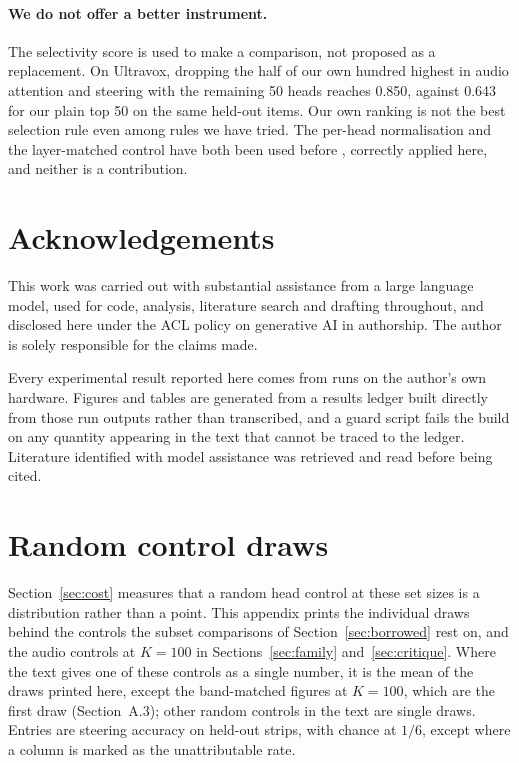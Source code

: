 \documentclass[11pt]{article}
\begin{document}
\paragraph{We do not offer a better instrument.} The selectivity score is used to
make a comparison, not proposed as a replacement. On Ultravox, dropping the
half of our own hundred highest in audio attention and steering with the remaining 50 heads
reaches 0.850, against 0.643 for our plain top 50 on the same held-out items. Our
own ranking is not the best selection rule even among rules we have tried. The
per-head normalisation and the layer-matched control have both been used before
\citep{kang2025sink, shengfu2026matched}, correctly applied here, and
neither is a contribution.

\section*{Acknowledgements}

This work was carried out with substantial assistance from a large language
model, used for code, analysis, literature search and drafting throughout, and
disclosed here under the ACL policy on generative AI in authorship. The author
is solely responsible for the claims made.

Every experimental result reported here comes from runs on the author's own
hardware. Figures and tables are generated from a results ledger built directly
from those run outputs rather than transcribed, and a guard script fails the
build on any quantity appearing in the text that cannot be traced to the ledger.
Literature identified with model assistance was retrieved and read before being
cited.

\begingroup\makeatletter
\def\@listi{\leftmargin\leftmargini \parsep 1pt \topsep 2pt \itemsep 1pt}\let\@listI\@listi
\makeatother

\endgroup

\clearpage
\onecolumn
\raggedbottom
\appendix
\section{Random control draws}
\label{app:sets}

Section~\ref{sec:cost} measures that a random head control at these set sizes is a
distribution rather than a point. This appendix prints the individual draws behind
the controls the subset comparisons of Section~\ref{sec:borrowed} rest on, and the
audio controls at $K{=}100$ in Sections~\ref{sec:family} and~\ref{sec:critique}.
Where the text gives one of these controls as a single number, it is the mean of
the draws printed here, except the band-matched figures at $K{=}100$, which are the
first draw (Section~A.3); other random controls in the text are single draws.
Entries are steering accuracy on held-out strips, with chance at $1/6$, except
where a column is marked as the unattributable rate.
\end{document}
